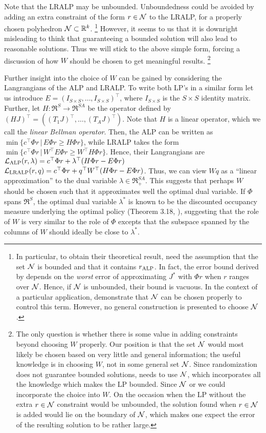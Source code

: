 Note that the LRALP may be unbounded. 
Unboundedness could be avoided by adding an extra constraint of the form $r\in \mathcal{N}$ to the LRALP,
for a properly chosen polyhedron $\mathcal{N} \subset \mathbb{R}^k$.%
\footnote{
In particular, to obtain their theoretical result, \citet{CS} need the assumption that the set $\mathcal{N}$ 
is bounded and that it contains $r_{\text{ALP}}$. In fact, 
the error bound derived by \citeauthor{CS} depends on the \emph{worst} 
error of approximating $J^*$ with $\Phi r$ when
$r$ ranges over $\mathcal{N}$. Hence, if $\mathcal{N}$ is unbounded, their bound is vacuous. In the context of a particular application, 
\citet{CS} demonstrate that $\mathcal{N}$ can be chosen properly to control this term. 
However, no general construction is presented to choose $\mathcal{N}$.}
However, it seems to us that it is downright misleading to think that guaranteeing a bounded solution 
will also lead to reasonable solutions.
Thus we will stick to the above simple form, forcing a discussion of how $W$ should be chosen to get meaningful results.%
\footnote{
The only question is whether there is some value in adding constraints beyond choosing $W$ properly.
Our position is that the set $\mathcal{N}$ would most likely be chosen based on very little and general information;
the useful knowledge is in choosing $W$, not in some general set $\mathcal{N}$. 
Since randomization does not guarantee bounded solutions, \citet{ALP} needs to use $\mathcal{N}$, which incorporates
all the knowledge which makes the LP bounded. Since 
$\mathcal{N}$
or we could incorporate the choice into $W$.
On the occasion when the LP without the extra $r\in \mathcal{N}$ constraint would be unbounded,
the solution found when $r\in \mathcal{N}$ is added would lie on the boundary of $\mathcal{N}$, which
makes one expect the error of the resulting solution to be rather large.
}

Further insight into the choice of $W$ can be gained by
considering the Langrangians of the ALP and LRALP. To write both LP's in a similar form let us introduce $E = (I_{S\times S},\dots,I_{S\times S})^\top$, where $I_{S\times S}$ is the $S\times S$ identity matrix. Further, let $H:\Re^S \to \Re^{SA}$ be the operator defined by $(HJ)^\top = ( (T_1 J)^\top, \dots, (T_A J)^\top )$. Note that $H$ is a linear operator, which we call the \emph{linear Bellman operator}. 
Then, the ALP can be written as $\min\{ c^\top \Phi r \,|\, E \Phi r \ge H \Phi r \}$, while LRALP takes the form  
$\min\{ c^\top \Phi r \,|\, W^\top E \Phi r \ge W^\top H \Phi r \}$. 
Hence, their Langrangians are $\mathcal{L}_{\text{ALP}}(r,\lambda) = c^\top \Phi r+\lambda^\top (H\Phi r-E\Phi r)$
$\mathcal{L}_{\text{LRALP}}(r,q) = c^\top \Phi r+q^\top W^\top (H\Phi r-E\Phi r)$. Thus, we can view $W q$ as a ``linear approximation''
to the dual variable $\lambda \in \Re_+^{SA}$. 
This suggests that perhaps $W$ should be chosen such that it approximates well the optimal dual variable.
If $\Phi$ spans $\Re^{S}$, the optimal dual variable $\lambda^*$ is known to be the discounted occupancy measure underlying the optimal policy (Theorem 3.18, \cite{Kall17}), suggesting that the role of $W$ is very similar to the role of $\Phi$ excepts that the subspace spanned by the columns of $W$ should ideally be close to $\lambda^*$.


